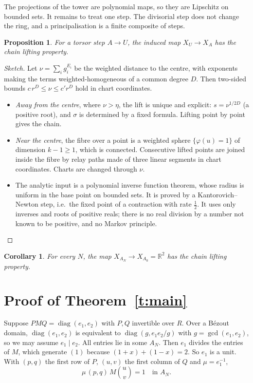 \documentclass[11pt]{article}
\newcommand{\R}{\mathbb{R}}
\numberwithin{equation}{section}
\theoremstyle{plain}
\newtheorem{proposition}[theorem]{Proposition}
\newtheorem{corollary}[theorem]{Corollary}
\theoremstyle{definition}
\theoremstyle{remark}
\begin{document}
The projections of the tower are polynomial maps, so they are Lipschitz on bounded sets. It
remains to treat one step. The divisorial step does not change the ring, and a principalisation is
a finite composite of steps.

\begin{proposition}\label{p:onestep}
For a torsor step $A\to U$, the induced map $X_U\to X_A$ has the chain lifting property.
\end{proposition}

\begin{proof}[Sketch]
Let $\nu=\sum_i g_i^{E_i}$ be the weighted distance to the centre, with exponents making the terms
weighted-homogeneous of a common degree $D$. Then two-sided bounds $c\,r^D\le\nu\le c'r^D$ hold in
chart coordinates.
\begin{itemize}
\item \emph{Away from the centre}, where $\nu>\eta$, the lift is unique and explicit:
  $s=\nu^{1/2D}$ (a positive root), and $\sigma$ is determined by a fixed formula. Lifting point
  by point gives the chain.
\item \emph{Near the centre}, the fibre over a point is a weighted sphere $\{\varphi(u)=1\}$ of
  dimension $k-1\ge1$, which is connected. Consecutive lifted points are joined inside the fibre by
  relay paths made of three linear segments in chart coordinates. Charts are changed through
  $\nu$.
\item The analytic input is a polynomial inverse function theorem, whose radius is uniform in the
  base point on bounded sets. It is proved by a Kantorovich--Newton step, i.e.\ the fixed point of
  a contraction with rate $\frac12$. It uses only inverses and roots of positive reals; there is no
  real division by a number not known to be positive, and no Markov principle.\qedhere
\end{itemize}
\end{proof}

\begin{corollary}\label{c:tower}
For every $N$, the map $X_{A_N}\to X_{A_0}=\R^2$ has the chain lifting property.
\end{corollary}

\section{Proof of Theorem~\ref{t:main}}\label{s:end}

Suppose $PMQ=\operatorname{diag}(e_1,e_2)$ with $P,Q$ invertible over $R$. Over a Bézout domain,
$\operatorname{diag}(e_1,e_2)$ is equivalent to $\operatorname{diag}(g,e_1e_2/g)$ with
$g=\gcd(e_1,e_2)$, so we may assume $e_1\mid e_2$. All entries lie in some $A_N$. Then $e_1$ divides
the entries of $M$, which generate $(1)$ because $(1+x)+(1-x)=2$. So $e_1$ is a unit. With $(p,q)$ the first row of $P$, $(u,v)$ the first column of
$Q$ and $\mu=e_1^{-1}$,
\begin{equation}\label{e:id}
\mu\,(p,q)\,M\binom uv=1\quad\text{in }A_N .
\end{equation}
\end{document}

